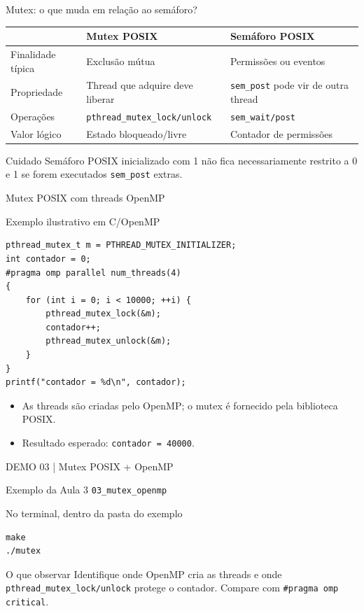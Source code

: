 \documentclass[aspectratio=169,11pt]{beamer}
\begin{document}
\begin{frame}{Mutex: o que muda em relação ao semáforo?}
\small
\begin{tabular}{p{3cm}p{4.3cm}p{3cm}}
\toprule
 & \textbf{Mutex POSIX} & \textbf{Semáforo POSIX}\\
\midrule
Finalidade típica & Exclusão mútua & Permissões ou eventos\\
Propriedade & Thread que adquire deve liberar & \texttt{sem\_post} pode vir de outra thread\\
Operações & \texttt{pthread\_mutex\_lock/unlock} & \texttt{sem\_wait/post}\\
Valor lógico & Estado bloqueado/livre & Contador de permissões\\
\bottomrule
\end{tabular}
\vspace{.3cm}
\begin{alertblock}{Cuidado}
Semáforo POSIX inicializado com 1 não fica necessariamente restrito a 0 e 1 se forem executados \texttt{sem\_post} extras.
\end{alertblock}
\end{frame}

\begin{frame}[fragile]{Mutex POSIX com threads OpenMP}
\small
\begin{block}{Exemplo ilustrativo em C/OpenMP}
\begin{verbatim}
pthread_mutex_t m = PTHREAD_MUTEX_INITIALIZER;
int contador = 0;
#pragma omp parallel num_threads(4)
{
    for (int i = 0; i < 10000; ++i) {
        pthread_mutex_lock(&m);
        contador++;
        pthread_mutex_unlock(&m);
    }
}
printf("contador = %d\n", contador);
\end{verbatim}
\end{block}
\begin{itemize}
\item As threads são criadas pelo OpenMP; o mutex é fornecido pela biblioteca POSIX.
\item Resultado esperado: \texttt{contador = 40000}.
\end{itemize}
\end{frame}


\begin{frame}[fragile]{DEMO 03 | Mutex POSIX + OpenMP}
\small
\begin{block}{Exemplo da Aula 3}
\texttt{03\_mutex\_openmp}
\end{block}
\begin{block}{No terminal, dentro da pasta do exemplo}
\begin{verbatim}
make
./mutex
\end{verbatim}
\end{block}
\begin{exampleblock}{O que observar}
Identifique onde OpenMP cria as threads e onde \texttt{pthread\_mutex\_lock/unlock} protege o contador. Compare com \texttt{\#pragma omp critical}.
\end{exampleblock}
\end{frame}
\end{document}
